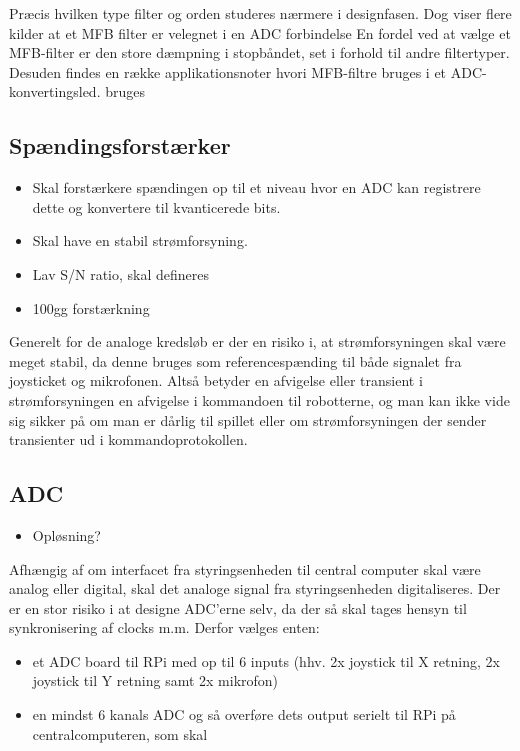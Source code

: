 Præcis hvilken type filter og orden studeres nærmere i designfasen. Dog viser flere kilder at et MFB filter er velegnet i en ADC forbindelse \cite[s.~413]{Horowitz2015}
En fordel ved at vælge et MFB-filter er den store dæmpning i stopbåndet, set i forhold til andre filtertyper\cite{ADCMFBTI}. Desuden findes en række applikationsnoter hvori MFB-filtre bruges i et ADC-konvertingsled. bruges\cite{OPA344Data}\tbr
{}
\subsection{Spændingsforstærker}
\begin{itemize}
    \item Skal forstærkere spændingen op til et niveau hvor en ADC kan registrere dette og konvertere til kvanticerede bits.
    \item Skal have en stabil strømforsyning.
    \item Lav S/N ratio, \tbr skal defineres
    \item 100gg forstærkning \tbr
\end{itemize}
Generelt for de analoge kredsløb er der en risiko i, at strømforsyningen skal være meget stabil, da denne bruges som referencespænding til både signalet fra joysticket og mikrofonen. Altså betyder en afvigelse eller transient i strømforsyningen en afvigelse i kommandoen til robotterne, og man kan ikke vide sig sikker på om man er dårlig til spillet eller om strømforsyningen der sender transienter ud i kommandoprotokollen. 


\subsection{ADC}
\begin{itemize}
    \item \tbr Opløsning?
\end{itemize}
\tbr Afhængig af om interfacet fra styringsenheden til central computer skal være analog eller digital, skal det analoge signal fra styringsenheden digitaliseres. 
Der er en stor risiko i at designe ADC'erne selv, da der så skal tages hensyn til synkronisering af clocks m.m. Derfor vælges enten:
\begin{itemize}
    \item et ADC board til RPi med op til 6 inputs (hhv. 2x joystick til X retning, 2x joystick til Y retning samt 2x mikrofon)
    \item en mindst 6 kanals ADC og så overføre dets output serielt til RPi på centralcomputeren, som skal 
\end{itemize}

